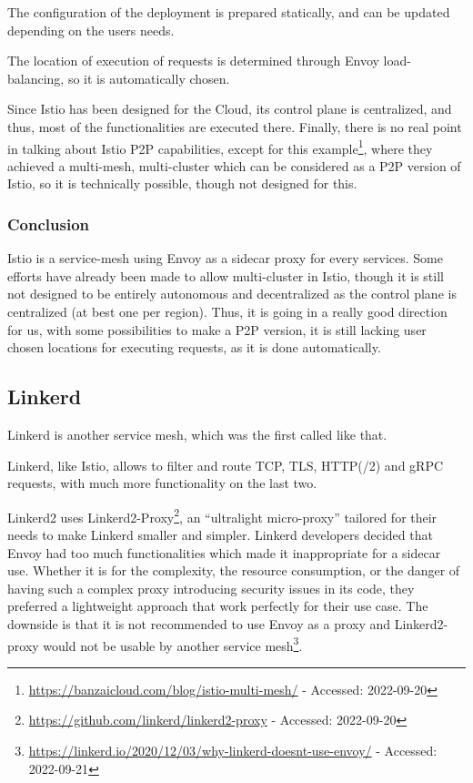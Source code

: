 The configuration of the deployment is prepared statically, and can be
updated depending on the users needs.

The location of execution of requests is determined through Envoy
load-balancing, so it is automatically chosen.

Since Istio has been designed for the Cloud, its control plane is
centralized, and thus, most of the functionalities are executed there.
%
Finally, there is no real point in talking about Istio \acrshort{P2P}
capabilities, except for this
example\footnote{\url{https://banzaicloud.com/blog/istio-multi-mesh/}
  - Accessed: 2022-09-20}, where they achieved a multi-mesh,
multi-cluster which can be considered as a \acrshort{P2P} version of Istio, so it
is technically possible, though not designed for this.
%

\subsubsection*{Conclusion}

Istio is a service-mesh using Envoy as a sidecar proxy for every
services.
%
Some efforts have already been made to allow multi-cluster in Istio,
though it is still not designed to be entirely autonomous and
decentralized as the control plane is centralized (at best one per
region).
%
Thus, it is going in a really good direction for us, with some
possibilities to make a P2P version, it is still lacking user chosen
locations for executing requests, as it is done automatically.



\subsection{Linkerd~\cite{linkerd}}
\label{sec:soa-linkerd}

Linkerd is another service mesh, which was the first called like that.
%

Linkerd, like Istio, allows to filter and route \acrshort{TCP},
\acrshort{TLS}, HTTP(/2) and \acrshort{gRPC} requests, with much more
functionality on the last two.


Linkerd2 uses
Linkerd2-Proxy\footnote{\url{https://github.com/linkerd/linkerd2-proxy}
  - Accessed: 2022-09-20}, an ``ultralight micro-proxy'' tailored for
their needs to make Linkerd smaller and simpler.
%
Linkerd developers decided that Envoy had too much
functionalities which made it inappropriate for a sidecar use.
%
Whether it is for the complexity, the resource consumption, or the
danger of having such a complex proxy introducing security issues in
its code, they preferred a lightweight approach that work perfectly
for their use case.
%
The downside is that it is not recommended to use Envoy as a proxy and
Linkerd2-proxy would not be usable by another service
mesh\footnote{\url{https://linkerd.io/2020/12/03/why-linkerd-doesnt-use-envoy/}
  - Accessed: 2022-09-21}.

